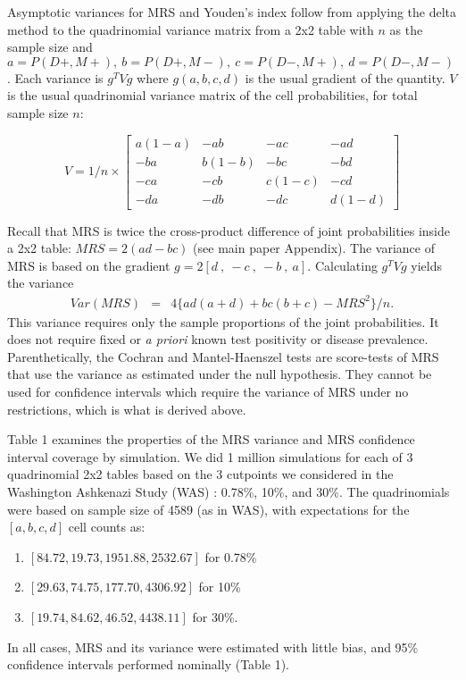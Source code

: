 \documentclass[AMA,STIX1COL]{WileyNJD-v2}
\begin{document}
Asymptotic variances for MRS and Youden's index follow from applying the delta method to the quadrinomial variance matrix from a 2x2 table with $n$ as the sample size and $a=P(D+,M+),~b=P(D+,M-),~c=P(D-,M+),~d=P(D-,M-)$.  Each variance is $g^TVg$ where $g(a,b,c,d)$ is the usual gradient of the quantity.  $V$ is the usual quadrinomial variance matrix of the cell probabilities, for total sample size $n$: 

\[
V=1/n \times
\begin{bmatrix}
a(1-a) & -ab & -ac & -ad \\
-ba & b(1-b) & -bc & -bd \\
-ca & -cb & c(1-c) & -cd \\
-da & -db & -dc & d(1-d)
\end{bmatrix}
\]

Recall that MRS is twice the cross-product difference of joint probabilities inside a 2x2 table: $MRS = 2(ad-bc)$ (see main paper Appendix).  The variance of MRS is based on the gradient $g=2[d~,~-c~,~-b~,~a]$.  Calculating $g^TVg$ yields the variance
\begin{eqnarray*}
	Var(MRS) &=& 4\{ ad(a+d)+bc(b+c)-MRS^2 \}/n.
\end{eqnarray*}
This variance requires only the sample proportions of the joint probabilities.  It does not require fixed or \textit{a priori} known test positivity or disease prevalence.   Parenthetically, the Cochran and Mantel-Haenszel tests are score-tests of MRS that use the variance as estimated under the null hypothesis.  They cannot be used for confidence intervals which require the variance of MRS under no restrictions, which is what is derived above.

Table 1 examines the properties of the MRS variance and MRS confidence interval coverage by simulation.  We did 1 million simulations for each of 3 quadrinomial 2x2 tables based on the 3 cutpoints we considered in the Washington Ashkenazi Study (WAS) : 0.78\%, 10\%, and 30\%.  The quadrinomials were based on sample size of 4589 (as in WAS), with expectations for the $[a,b,c,d]$ cell counts as: 
\begin{enumerate}
	\item $[84.72, 19.73, 1951.88, 2532.67]$ for 0.78\%
	\item $[29.63, 74.75, 177.70, 4306.92]$ for 10\%
	\item $[19.74, 84.62, 46.52, 4438.11]$ for 30\%.
\end{enumerate}
In all cases, MRS and its variance were estimated with little bias, and 95\% confidence intervals performed nominally (Table 1).
\end{document}
